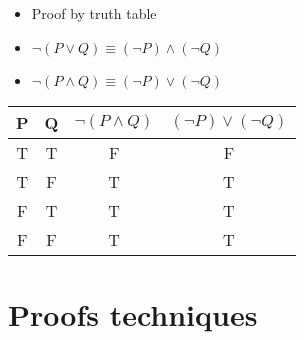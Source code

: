 \documentclass[english,10pt,a4paper]{article}
\begin{document}
\begin{theo} 
\begin{minipage}{0.5\linewidth}
\begin{itemize}
\item Proof by truth table
\item $\neg (P \vee Q) \equiv (\neg P) \wedge (\neg Q)$
\item $\neg (P \wedge Q) \equiv (\neg P) \vee (\neg Q)$
\end{itemize}

\end{minipage}
\hspace{0.1cm}
\begin{minipage}{0.3\linewidth}

\begin{tabular}{cc|c|c}
P & Q & $\neg (P \wedge Q)$ & $(\neg P) \vee (\neg Q)$\\ 
\hline
T & T & F & F\\ 
T & F & T & T\\
F & T & T & T\\
F & F & T & T
\end{tabular} 
\end{minipage}
\end{theo}


\newpage
\section{Proofs techniques}
\end{document}
